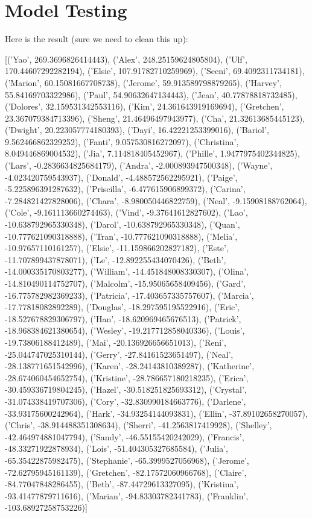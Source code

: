 \documentclass{icmmcm}
\begin{document}
\section{Model Testing}

Here is the result (sure we need to clean this up):


[('Yao', 269.3696826414443), ('Alex', 248.25159624805804), ('Ulf', 170.44607292282194), ('Elsie', 107.91782710259969), ('Seeni', 69.4092311734181), ('Marion', 60.15081667708738), ('Jerome', 59.913589798879265), ('Harvey', 55.84169703322986), ('Paul', 54.90632647134443), ('Jean', 40.77878818732485), ('Dolores', 32.159531342553116), ('Kim', 24.361643919169694), ('Gretchen', 23.367079384713396), ('Sheng', 21.46496497943977), ('Cha', 21.32613685445123), ('Dwight', 20.223057774180393), ('Dayi', 16.42221253399016), ('Bariol', 9.562466862329252), ('Fanti', 9.057530816272097), ('Christina', 8.049446869004532), ('Jia', 7.114818405452967), ('Phille', 1.9477975402344825), ('Lars', -0.2836634825684179), ('Andra', -2.000893947500348), ('Wayne', -4.023420759543937), ('Donald', -4.488572562295921), ('Paige', -5.225896391287632), ('Priscilla', -6.477615906899372), ('Carina', -7.284821427828006), ('Chara', -8.980050446822759), ('Neal', -9.15908188762064), ('Cole', -9.161113660274463), ('Vind', -9.37641612827602), ('Lao', -10.638792965330348), ('Darol', -10.638792965330348), ('Quan', -10.777621090318888), ('Tran', -10.777621090318888), ('Melia', -10.97657110161257), ('Elsie', -11.159866202827182), ('Este', -11.707899437878071), ('Le', -12.892255434070426), ('Beth', -14.000335170803277), ('William', -14.451848008330307), ('Olina', -14.810490114752707), ('Malcolm', -15.95065658409456), ('Gard', -16.775782982369233), ('Patricia', -17.403657335757607), ('Marcia', -17.77818082892289), ('Douglas', -18.297595195522916), ('Eric', -18.527678829306797), ('Han', -18.620969465676513), ('Patrick', -18.968384621380654), ('Wesley', -19.217712858040336), ('Louis', -19.73806188412489), ('Mai', -20.136926656651013), ('Reni', -25.044747025310144), ('Gerry', -27.84161523651497), ('Neal', -28.138771651542996), ('Karen', -28.24143810389287), ('Katherine', -28.674060454652754), ('Kristine', -28.786657180218235), ('Erica', -30.459336719804245), ('Hazel', -30.518251825693312), ('Crystal', -31.074338419707306), ('Cory', -32.830990184663776), ('Darlene', -33.93175600242964), ('Hark', -34.93254144093831), ('Ellin', -37.89102658270057), ('Chris', -38.914488351308634), ('Sherri', -41.2563817419928), ('Shelley', -42.464974881047794), ('Sandy', -46.55155420242029), ('Francis', -48.33271922878934), ('Lois', -51.404305327685584), ('Julia', -65.35422875982475), ('Stephanie', -65.3999527056968), ('Jerome', -72.62795945161139), ('Gretchen', -82.17572060966768), ('Claire', -84.77047848286455), ('Beth', -87.44729613327095), ('Kristina', -93.41477879711616), ('Marian', -94.83303782341783), ('Franklin', -103.68927258753226)]
\end{document}
